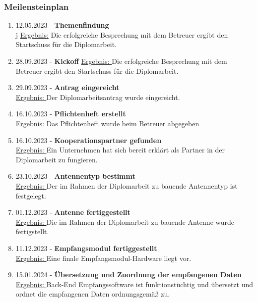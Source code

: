 \subsubsection{Meilensteinplan}

\begin{enumerate}
	\item 12.05.2023 - \textbf{Themenfindung}\\j
	\underline{Ergebnis:} Die erfolgreiche Besprechung mit dem Betreuer ergibt den Startschuss für die 
	Diplomarbeit.
	
	\item 28.09.2023 - \textbf{Kickoff}
	\underline{Ergebnis: }Die erfolgreiche Besprechung mit dem Betreuer ergibt den Startschuss für die 
	Diplomarbeit.
	
	\item 29.09.2023 - \textbf{Antrag eingereicht}\\
	\underline{Ergebnis: }Der Diplomarbeitsantrag wurde eingereicht.
	
	\item 16.10.2023 - \textbf{Pflichtenheft erstellt}\\
	\underline{Ergebnis: }Das Pflichtenheft wurde beim Betreuer abgegeben 
	
	\item 16.10.2023 - \textbf{Kooperationspartner gefunden}\\
	\underline{Ergebnis: }Ein Unternehmen hat sich bereit erklärt als Partner in der Diplomarbeit zu fungieren. 
	
	\item 23.10.2023 - \textbf{Antennentyp bestimmt}\\
	\underline{Ergebnis: }Der im Rahmen der Diplomarbeit zu bauende Antennentyp ist festgelegt. 
	
	\item 01.12.2023 - \textbf{Antenne fertiggestellt}\\
	\underline{Ergebnis: }Die im Rahmen der Diplomarbeit zu bauende Antenne wurde fertigstellt.
	
	\item 11.12.2023 - \textbf{Empfangsmodul fertiggestellt}\\
	\underline{Ergebnis: }Eine finale Empfangsmodul-Hardware liegt vor. 
	
	\item 15.01.2024 - \textbf{Übersetzung und Zuordnung der empfangenen Daten}\\
	\underline{Ergebnis: }Back-End Empfangssoftware ist funktionstüchtig und übersetzt und ordnet die 
	empfangenen Daten ordnungsgemäß zu.
	

\end{enumerate}
